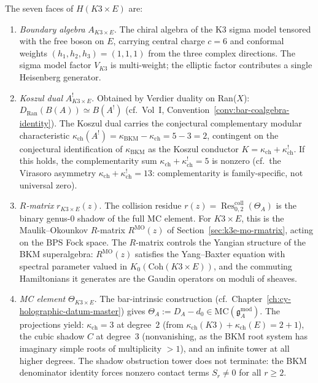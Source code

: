 \begin{construction}
\label{constr:k3e-holographic-datum}
The seven faces of $H(K3 \times E)$ are:
\begin{enumerate}[label=\textup{(\roman*)}]
 \item \emph{Boundary algebra} $A_{K3 \times E}$. The chiral algebra
 of the K3 sigma model tensored with the free boson on $E$,
 carrying central charge $c = 6$ and conformal weights
 $(h_1, h_2, h_3) = (1, 1, 1)$ from the three complex directions.
 The sigma model factor $V_{K3}$ is multi-weight;
 the elliptic factor contributes a single Heisenberg generator.

 \item \emph{Koszul dual} $A^!_{K3 \times E}$. Obtained by
 Verdier duality on Ran($X$): $D_{\mathrm{Ran}}(B(A)) \simeq B(A^!)$
 (cf.\ Vol~I, Convention~\ref{conv:bar-coalgebra-identity}).
 The Koszul dual carries the conjectural complementary modular
 characteristic
 $\kappa_{\mathrm{ch}}(A^!) = \kappa_{\mathrm{BKM}} - \kappa_{\mathrm{ch}} = 5 - 3 = 2$,
 contingent on the conjectural identification of $\kappa_{\mathrm{BKM}}$
 as the Koszul conductor $K = \kappa_{\mathrm{ch}} + \kappa_{\mathrm{ch}}^!$.
 If this holds, the complementarity sum
 $\kappa_{\mathrm{ch}} + \kappa_{\mathrm{ch}}^! = 5$ is
 nonzero (cf.\ the Virasoro
 asymmetry $\kappa_{\mathrm{ch}} + \kappa_{\mathrm{ch}}^! = 13$: complementarity is family-specific, not universal zero).

 \item \emph{$R$-matrix} $r_{K3 \times E}(z)$. The collision
 residue $r(z) = \operatorname{Res}^{\mathrm{coll}}_{0,2}(\Theta_A)$
 is the binary genus-$0$ shadow of the full MC element. For
 $K3 \times E$, this is the Maulik--Okounkov $R$-matrix
 $R^{\mathrm{MO}}(z)$ of Section~\ref{sec:k3e-mo-rmatrix},
 acting on the BPS Fock space. The $R$-matrix controls the
 Yangian structure of the BKM superalgebra: $R^{\mathrm{MO}}(z)$
 satisfies the Yang--Baxter equation with spectral parameter
 valued in $K_0(\mathrm{Coh}(K3 \times E))$, and the commuting
 Hamiltonians it generates are the Gaudin operators on
 moduli of sheaves.

 \item \emph{MC element} $\Theta_{K3 \times E}$. The bar-intrinsic
 construction (cf.\ Chapter~\ref{ch:cy-holographic-datum-master})
 gives $\Theta_A := D_A - d_0 \in \mathrm{MC}(\mathfrak{g}^{\mathrm{mod}}_{A})$.
 The projections yield: $\kappa_{\mathrm{ch}} = 3$ at degree~$2$
 (from $\kappa_{\mathrm{ch}}(K3) + \kappa_{\mathrm{ch}}(E) = 2 + 1$), the cubic
 shadow $C$ at degree~$3$ (nonvanishing, as the BKM root
 system has imaginary simple roots of multiplicity $> 1$),
 and an infinite tower at all higher degrees. The shadow
 obstruction tower does not terminate: the BKM denominator
 identity forces nonzero contact terms $S_r \neq 0$ for
 all $r \geq 2$.


\end{enumerate}
\end{construction}
